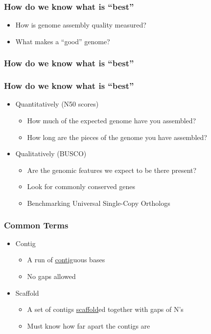 \documentclass[14pt,handout]{beamer}
\begin{document}
\begin{frame}
\frametitle{How do we know what is ``best''}
\begin{itemize}
	\item<+-> How is genome assembly quality measured?
	\item<+-> What makes a ``good'' genome?
\end{itemize}
\end{frame}

\begin{frame}
\frametitle{How do we know what is ``best''}
\end{frame}

\begin{frame}
\frametitle{How do we know what is ``best''}
\begin{itemize}
	\item<+-> Quantitatively (N50 scores)
	\begin{itemize}
		\item<+-> How much of the expected genome have you assembled?
		\item<+-> How long are the pieces of the genome you have assembled?
	\end{itemize}
	\item<+-> Qualitatively (BUSCO)
	\begin{itemize}
		\item<+-> Are the genomic features we expect to be there present?
		\item<+-> Look for commonly conserved genes
		\item<+-> Benchmarking Universal Single-Copy Orthologs
	\end{itemize}
\end{itemize}
\end{frame}

\begin{frame}
\frametitle{Common Terms}
\begin{itemize}
	\item<+-> Contig
	\begin{itemize}
		\item<+-> A run of \underline{contig}uous bases
		\item<+-> No gaps allowed
	\end{itemize}
	\item<+-> Scaffold
	\begin{itemize}
		\item<+-> A set of contigs \underline{scaffold}ed together with gaps of N's
		\item<+-> Must know how far apart the contigs are
	\end{itemize}
\end{itemize}
\end{frame}
\end{document}
